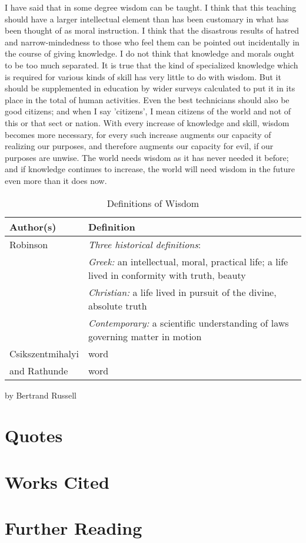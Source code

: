I have said that in some degree wisdom can be taught.
I think that this teaching should have a larger
intellectual element than has been customary in what
has been thought of as moral instruction. I think that
the disastrous results of hatred and narrow-mindedness
to those who feel them can be pointed out incidentally
in the course of giving knowledge. I do not think that
knowledge and morals ought to be too much separated.
It is true that the kind of specialized knowledge
which is required for various kinds of skill has very
little to do with wisdom. But it should be
supplemented in education by wider surveys calculated
to put it in its place in the total of human
activities. Even the best technicians should also be
good citizens; and when I say 'citizens', I mean
citizens of the world and not of this or that sect or
nation. With every increase of knowledge and skill,
wisdom becomes more necessary, for every such increase
augments our capacity of realizing our purposes, and
therefore augments our capacity for evil, if our
purposes are unwise. The world needs wisdom as it has
never needed it before; and if knowledge continues to
increase, the world will need wisdom in the future
even more than it does now.

\begin{table*}
	\centering
	\begin{tabular}{lp{6cm}}
		\hline\hline
		Author(s) & Definition \\
		\hline
		Robinson	& \emph{Three historical definitions}: \\
							& \emph{Greek:} an intellectual, moral, practical life; a life lived in conformity with truth, beauty \\
							& \emph{Christian:} a life lived in pursuit of the divine, absolute truth \\
							& \emph{Contemporary:} a scientific understanding of laws governing matter in motion	\\
		\hline
		Csikszentmihalyi &	word	\\
		and Rathunde						&		word	\\
		\hline
	\end{tabular}
	\caption{Definitions of Wisdom}
\end{table*}

\begin{flushright}
by Bertrand Russell
\end{flushright}

\section{Quotes}

\section{Works Cited}

\section{Further Reading}


